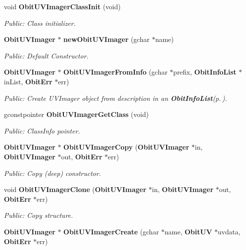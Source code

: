 \begin{CompactItemize}
\item 
void {\bf Obit\-UVImager\-Class\-Init} (void)
\begin{CompactList}\small\item\em Public: Class initializer. \item\end{CompactList}\item 
{\bf Obit\-UVImager} $\ast$ {\bf new\-Obit\-UVImager} (gchar $\ast$name)
\begin{CompactList}\small\item\em Public: Default Constructor. \item\end{CompactList}\item 
{\bf Obit\-UVImager} $\ast$ {\bf Obit\-UVImager\-From\-Info} (gchar $\ast$prefix, {\bf Obit\-Info\-List} $\ast$in\-List, {\bf Obit\-Err} $\ast$err)
\begin{CompactList}\small\item\em Public: Create UVImager object from description in an {\bf Obit\-Info\-List}{\rm (p.\,\pageref{structObitInfoList})}. \item\end{CompactList}\item 
gconstpointer {\bf Obit\-UVImager\-Get\-Class} (void)
\begin{CompactList}\small\item\em Public: Class\-Info pointer. \item\end{CompactList}\item 
{\bf Obit\-UVImager} $\ast$ {\bf Obit\-UVImager\-Copy} ({\bf Obit\-UVImager} $\ast$in, {\bf Obit\-UVImager} $\ast$out, {\bf Obit\-Err} $\ast$err)
\begin{CompactList}\small\item\em Public: Copy (deep) constructor. \item\end{CompactList}\item 
void {\bf Obit\-UVImager\-Clone} ({\bf Obit\-UVImager} $\ast$in, {\bf Obit\-UVImager} $\ast$out, {\bf Obit\-Err} $\ast$err)
\begin{CompactList}\small\item\em Public: Copy structure. \item\end{CompactList}\item 
{\bf Obit\-UVImager} $\ast$ {\bf Obit\-UVImager\-Create} (gchar $\ast$name, {\bf Obit\-UV} $\ast$uvdata, {\bf Obit\-Err} $\ast$err)

\end{CompactItemize}
